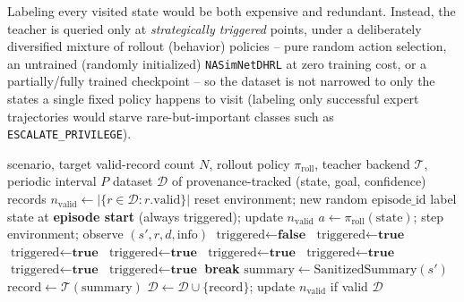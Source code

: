 \documentclass[11pt]{article}
\newcommand{\code}[1]{\texttt{#1}}
\begin{document}
Labeling every visited state would be both expensive and redundant. Instead, the
teacher is queried only at \emph{strategically triggered} points, under a
deliberately diversified mixture of rollout (behavior) policies -- pure random
action selection, an untrained (randomly initialized) \code{NASimNetDHRL} at zero
training cost, or a partially/fully trained checkpoint -- so the dataset is not
narrowed to only the states a single fixed policy happens to visit (labeling only
successful expert trajectories would starve rare-but-important classes such as
\code{ESCALATE\_PRIVILEGE}).

\begin{algorithm}[H]
\caption{Triggered State--Action Labeling (Dataset Collection)}
\label{alg:collect}
\begin{algorithmic}[1]
\Require scenario, target valid-record count $N$, rollout policy $\pi_{\text{roll}}$,
  teacher backend $\mathcal{T}$, periodic interval $P$
\Ensure dataset $\mathcal{D}$ of provenance-tracked (state, goal, confidence) records
\State $n_{\text{valid}} \gets |\{r \in \mathcal{D} : r.\text{valid}\}|$
  \State reset environment; new random $\text{episode\_id}$
  \State label state at \textbf{episode start} (always triggered); update $n_{\text{valid}}$
    \State $a \gets \pi_{\text{roll}}(\text{state})$; step environment; observe $(s', r, d, \text{info})$
    \State $\text{triggered} \gets \textbf{false}$
     $\text{triggered} \gets \textbf{true}$ 
     $\text{triggered} \gets \textbf{true}$ 
     $\text{triggered} \gets \textbf{true}$ 
     $\text{triggered} \gets \textbf{true}$ 
     $\text{triggered} \gets \textbf{true}$ 
     $\text{triggered} \gets \textbf{true}$
     $\text{triggered} \gets \textbf{true}$ 
    \EndIf
     \textbf{break} 
    \EndIf
      \State $\text{summary} \gets \text{SanitizedSummary}(s')$ 
      \State $\text{record} \gets \mathcal{T}(\text{summary})$ 
      \State $\mathcal{D} \gets \mathcal{D} \cup \{\text{record}\}$; update $n_{\text{valid}}$ if valid
    \EndIf
  \EndFor
\EndWhile
\State \Return $\mathcal{D}$
\end{algorithmic}
\end{algorithm}
\end{document}
